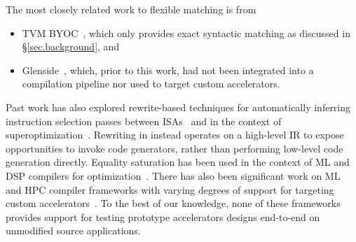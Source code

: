 The most closely related work to flexible matching is from 
\begin{itemize}
  \item TVM BYOC~\cite{chen2021byoc}, which only provides exact syntactic matching as discussed in \S\ref{sec.background}, and
  \item Glenside~\cite{smith2021pure}, which, prior to this work, had not been integrated into a compilation pipeline nor used to target custom accelerators.
\end{itemize}
Past work has also explored rewrite-based techniques for
  automatically inferring instruction selection passes
  between ISAs~\cite{
    ramsey2011resourceable,
    dias2010automatically}
  and in the context of superoptimization~\cite{
    bonsal-so,
    bonsal-so-translate}.
Rewriting in \TLA instead operates on a high-level IR
  to expose opportunities to invoke code generators,
  rather than performing low-level code generation directly.
Equality saturation has been
  used in the context of
  ML and DSP compilers for
  optimization~\cite{
    yang2021equality,
    alexa-dsp-eqsat,
    caviar-cc22}.
There has also been significant work on
  ML and HPC compiler frameworks with
  varying degrees of support for
  targeting custom accelerators~\cite{
    ragan2013halide,
    AtlPopl22,
    chen2018tvm,
    moreau2019hardware,
    lattner2021mlir}.
To the best of our knowledge,
  none of these frameworks provides support for
  testing prototype accelerators
  designs end-to-end on
  unmodified source applications.
  



